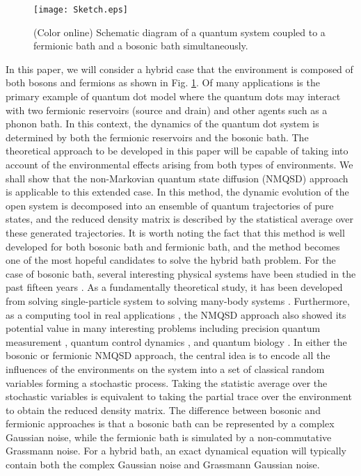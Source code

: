 \documentclass[preprint]{elsarticle}
\begin{document}
\begin{figure}
\begin{centering}
\texttt{[image: Sketch.eps]}
\end{centering}

\caption{(Color online) Schematic diagram of a quantum system coupled to a fermionic bath and a bosonic bath simultaneously.}


\label{Fig1}
\end{figure}

In this paper, we will consider a hybrid case that the environment
is composed of both bosons and fermions as shown in Fig. \ref{Fig1}. 
Of many applications is the  primary example  of quantum dot model where the quantum dots may interact
with two fermionic reservoirs (source and drain) and other agents such as 
a phonon bath. In this context, the dynamics of the quantum dot system is
determined by both the fermionic reservoirs and the bosonic bath. 
The theoretical approach to be developed in this paper will be
capable of taking into account of  the environmental effects arising from both
types of environments.  We shall show that the non-Markovian quantum state
diffusion (NMQSD) approach is applicable to this extended case.
In this method, the dynamic evolution
of the open system is decomposed into an ensemble of quantum trajectories of pure
states, and the reduced density matrix is described by the statistical
average over these generated trajectories. It is worth noting the fact that
this method is well developed for both bosonic bath and fermionic
bath, and the method becomes one of the most hopeful candidates
to solve the hybrid bath problem. For the case of bosonic bath, several interesting
physical systems have been studied in the past fifteen years \cite{QSD,Yu1999,YuQBM,Yu-FiniteT,Jing-Yu2010}.
As a fundamentally theoretical study, it has been developed from solving
single-particle system to solving many-body systems \cite{Nlevel,Nqubit,Ncavity}.
Furthermore, as a computing tool in real applications \cite{QSDHierachy,Lam},
the NMQSD approach also showed its potential value in many interesting
problems including precision quantum measurement \cite{Chen}, quantum control
dynamics \cite{JingPQ}, and quantum biology \cite{Eisfeld2011}.
In either the bosonic or fermionic NMQSD approach,
the central idea is to encode  all the influences  of the environments
on the system into a set of classical random variables forming a stochastic 
process. Taking the statistic average over the stochastic variables
is equivalent to taking the partial trace over the environment to
obtain the reduced density matrix. The difference between bosonic and fermionic approaches 
is that a bosonic bath can be represented by a complex Gaussian noise,
while the fermionic bath is simulated by a non-commutative Grassmann noise. 
For a hybrid bath, an exact dynamical equation will typically contain both the complex Gaussian
noise and Grassmann Gaussian noise.
 
\end{document}
